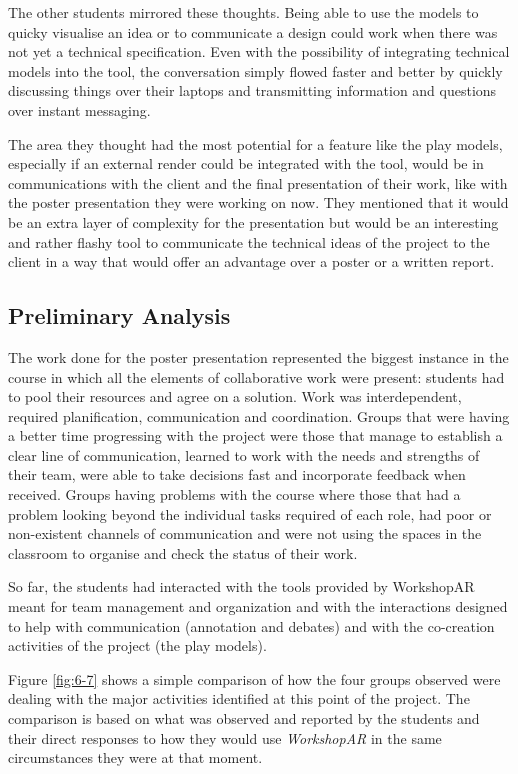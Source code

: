 The other students mirrored these thoughts. Being able to use the models to quicky visualise an idea or to communicate a design could work when there was not yet a
technical specification. Even with the possibility of integrating technical models into the tool, the conversation simply flowed faster and better by quickly discussing
things over their laptops and transmitting information and questions over instant messaging.

The area they thought had the most potential for a feature like the play models, especially if an external render could be integrated with the tool, would be in
communications with the client and the final presentation of their work, like with the poster presentation they were working on now. They mentioned that it would be an
extra layer of complexity for the presentation but would be an interesting and rather flashy tool to communicate the technical ideas of the project to the client in a way
that would offer an advantage over a poster or a written report.

\subsection{Preliminary Analysis \label{sec:6-5-3}}

The work done for the poster presentation represented the biggest instance in the course in which all the elements of collaborative work were present: students had to pool
their resources and agree on a solution. Work was interdependent, required planification, communication and coordination. Groups that were having a better time progressing
with the project were those that manage to establish a clear line of communication, learned to work with the needs and strengths of their team, were able to take decisions
fast and incorporate feedback when received. Groups having problems with the course where those that had a problem looking beyond the individual tasks required of each role,
had poor or non-existent channels of communication and were not using the spaces in the classroom to organise and check the status of their work.

So far, the students had interacted with the tools provided by WorkshopAR meant for team management and organization and with the interactions designed to help with
communication (annotation and debates) and with the co-creation activities of the project (the play models).

Figure \ref{fig:6-7} shows a simple comparison of how the four groups observed were dealing with the major activities identified at this point of the project. The
comparison is based on what was observed and reported by the students and their direct responses to how they would use \emph{WorkshopAR} in the same circumstances they were
at that moment.

